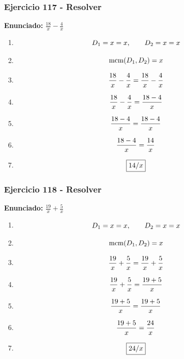 \documentclass[11pt,a4paper]{article}
\newcommand{\fitmath}[1]{%
\[
\setbox0=\hbox{$\displaystyle #1$}%
\ifdim\wd0>\linewidth
\resizebox{\linewidth}{!}{$\displaystyle #1$}%
\else
#1%
\fi
\]
}
\begin{document}
\vspace{0.12cm}
\subsubsection*{Ejercicio 117 - Resolver}
\textbf{Enunciado:} $ \frac{18}{x} - \frac{4}{x} $\par
\begin{enumerate}[leftmargin=2em]
\item \fitmath{D_1=x=x,\qquad D_2=x=x}
\item \fitmath{\operatorname{mcm}(D_1,D_2)=x}
\item \fitmath{\frac{18}{x} - \frac{4}{x}= \frac{18}{x} - \frac{4}{x}}
\item \fitmath{\frac{18}{x} - \frac{4}{x}=\frac{18 - 4}{x}}
\item \fitmath{\frac{18 - 4}{x}=\frac{18 - 4}{x}}
\item \fitmath{\frac{18 - 4}{x}=\frac{14}{x}}
\item \fitmath{\boxed{14 / x}}
\end{enumerate}

\vspace{0.12cm}
\subsubsection*{Ejercicio 118 - Resolver}
\textbf{Enunciado:} $ \frac{19}{x} + \frac{5}{x} $\par
\begin{enumerate}[leftmargin=2em]
\item \fitmath{D_1=x=x,\qquad D_2=x=x}
\item \fitmath{\operatorname{mcm}(D_1,D_2)=x}
\item \fitmath{\frac{19}{x} + \frac{5}{x}= \frac{19}{x} + \frac{5}{x}}
\item \fitmath{\frac{19}{x} + \frac{5}{x}=\frac{19 + 5}{x}}
\item \fitmath{\frac{19 + 5}{x}=\frac{19 + 5}{x}}
\item \fitmath{\frac{19 + 5}{x}=\frac{24}{x}}
\item \fitmath{\boxed{24 / x}}
\end{enumerate}

\vspace{0.12cm}
\end{document}
